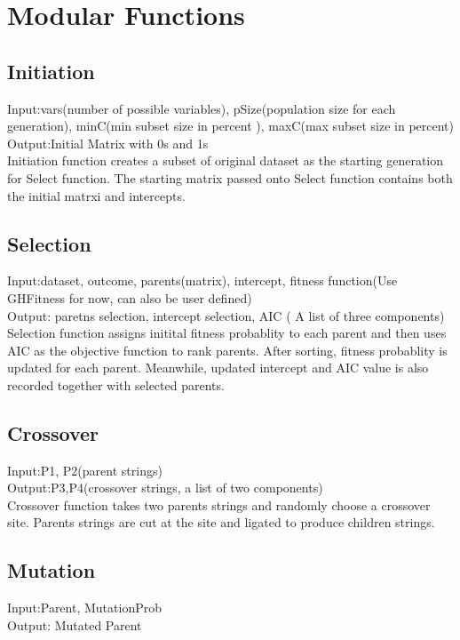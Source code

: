 \documentclass{article}\usepackage[]{graphicx}\usepackage[]{color}
\begin{document}
\section{Modular Functions}
\subsection{Initiation}
Input:vars(number of possible variables), pSize(population size for each generation), minC(min subset size in percent
), maxC(max subset size in percent)\\
Output:Initial Matrix with 0s and 1s\\

Initiation function creates a subset of original dataset as the starting generation for Select function. The starting matrix passed onto Select function contains both the initial matrxi and intercepts. \\
\subsection{Selection}
Input:dataset, outcome, parents(matrix), intercept, fitness function(Use GHFitness for now, can also be user defined)\\
Output: paretns selection, intercept selection, AIC ( A list of three components)\\

Selection function assigns initital fitness probablity to each parent and then uses AIC as the objective function to rank parents. After sorting, fitness probablity is updated for each parent. Meanwhile, updated intercept and AIC value is also recorded together with selected parents.\\
\subsection{Crossover}
Input:P1, P2(parent strings)\\
Output:P3,P4(crossover strings, a list of two components)\\

Crossover function takes two parents strings and randomly choose a crossover site. Parents strings are cut at the site and ligated to produce children strings.
\subsection{Mutation}
Input:Parent, MutationProb\\
Output: Mutated Parent \\
\end{document}
